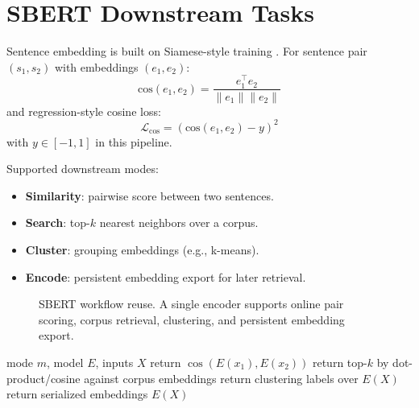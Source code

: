 \section{SBERT Downstream Tasks}
\label{sec:sbert}

Sentence embedding is built on Siamese-style training \citep{reimers_sentence-bert_2019}. For sentence pair $(s_1,s_2)$ with embeddings $(e_1,e_2)$:
\[
\text{cos}(e_1,e_2)=\frac{e_1^\top e_2}{\|e_1\|\|e_2\|}
\]
and regression-style cosine loss:
\[
\mathcal{L}_{\text{cos}}=\left(\text{cos}(e_1,e_2)-y\right)^2
\]
with $y\in[-1,1]$ in this pipeline.

Supported downstream modes:
\begin{itemize}[leftmargin=*]
    \item \textbf{Similarity}: pairwise score between two sentences.
    \item \textbf{Search}: top-$k$ nearest neighbors over a corpus.
    \item \textbf{Cluster}: grouping embeddings (e.g., k-means).
    \item \textbf{Encode}: persistent embedding export for later retrieval.
\end{itemize}

\begin{figure}[t]
\centering
{}
\caption{SBERT workflow reuse. A single encoder supports online pair scoring, corpus retrieval, clustering, and persistent embedding export.}
\label{fig:sbert-modes}
\end{figure}

\begin{algorithm}[t]
\caption{SBERT Inference Mode Router}
\begin{algorithmic}[1]
\Require mode $m$, model $E$, inputs $X$
    \State return $\cos(E(x_1),E(x_2))$
    \State return top-$k$ by dot-product/cosine against corpus embeddings
    \State return clustering labels over $E(X)$
\Else
    \State return serialized embeddings $E(X)$
\EndIf
\end{algorithmic}
\end{algorithm}

